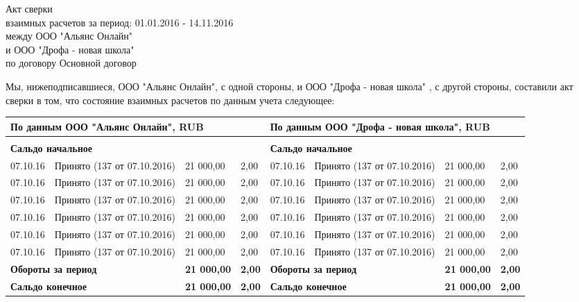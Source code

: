 \documentclass[a4paper,10pt]{article}
\begin{document}
\begin{center} {\Large Акт сверки \\
\normalsize взаимных расчетов за период: 01.01.2016 - 14.11.2016 \\
между ООО "Альянс Онлайн" \\
и ООО "Дрофа - новая школа" \\
по договору Основной договор}
\end{center}

\flushleft
Мы, нижеподписавшиеся, ООО "Альянс Онлайн", с одной стороны, и ООО "Дрофа - новая школа" , с другой стороны, составили акт сверки в том, что состояние взаимных расчетов по данным учета следующее:

\footnotesize
\begin{longtable}{|p{25pt}|p{100pt}|p{40pt}|p{40pt}|p{25pt}|p{100pt}|p{40pt}|p{40pt}|}
\hline
\multicolumn{4}{|p{250pt}|}{По данным ООО "Альянс Онлайн", RUB} & \multicolumn{4}{p{250pt}|}{По данным ООО "Дрофа - новая школа", RUB}\\
\hline
\centering {\textbf{Дата}} & \centering {\textbf{Документ}} & \centering {\textbf{Дебет}} & \centering {\textbf{Кредит}} & \centering {\textbf{Дата}} & \centering {\textbf{Документ}} & \centering {\textbf{Дебет}} & \centering {\textbf{Кредит}} \arraybackslash \\
\hline
\multicolumn{4}{|p{250pt}|}{ \textbf{Сальдо начальное}} & \multicolumn{4}{p{250pt}|}{\textbf{Сальдо начальное}}\\
\hline
07.10.16 & Принято (137 от 07.10.2016) & 21 000,00 & 2,00 & 07.10.16 & Принято (137 от 07.10.2016) & 21 000,00 & 2,00 \\ 
\hline
07.10.16 & Принято (137 от 07.10.2016) & 21 000,00 & 2,00 & 07.10.16 & Принято (137 от 07.10.2016) & 21 000,00 & 2,00 \\ 
\hline
07.10.16 & Принято (137 от 07.10.2016) & 21 000,00 & 2,00 & 07.10.16 & Принято (137 от 07.10.2016) & 21 000,00 & 2,00 \\ 
\hline
07.10.16 & Принято (137 от 07.10.2016) & 21 000,00 & 2,00 & 07.10.16 & Принято (137 от 07.10.2016) & 21 000,00 & 2,00 \\ 
\hline
07.10.16 & Принято (137 от 07.10.2016) & 21 000,00 & 2,00 & 07.10.16 & Принято (137 от 07.10.2016) & 21 000,00 & 2,00 \\ 
\hline
07.10.16 & Принято (137 от 07.10.2016) & 21 000,00 & 2,00 & 07.10.16 & Принято (137 от 07.10.2016) & 21 000,00 & 2,00 \\ 
\hline
\multicolumn{2}{|p{125pt}|}{\textbf{Обороты за период}} & \textbf{21 000,00} & \textbf{2,00} & \multicolumn{2}{p{125pt}|}{\textbf{Обороты за период}} & \textbf{21 000,00} & \textbf{2,00} \\ 
\hline
\multicolumn{2}{|p{125pt}|}{\textbf{Сальдо конечное}} & \textbf{21 000,00} & \textbf{2,00} & \multicolumn{2}{p{125pt}|}{\textbf{Сальдо конечное}} & \textbf{21 000,00} & \textbf{2,00} \\ 
\hline
\end{longtable}
\end{document}
